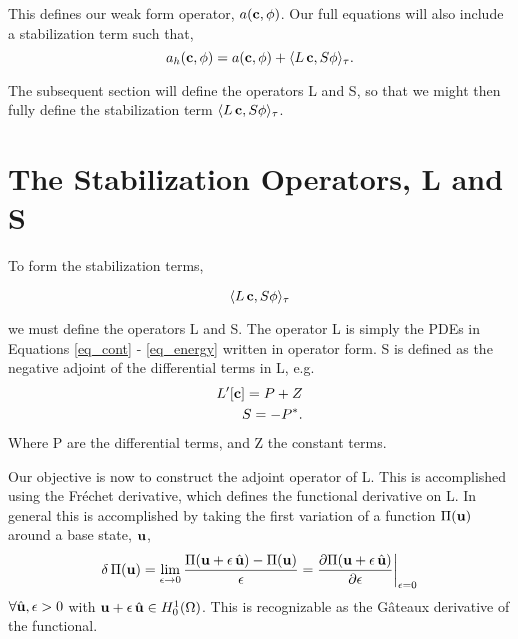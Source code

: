 This defines our weak form operator, $ a({\bf c},{\bf \phi})$. Our full equations will
also include a stabilization term such that,  
\begin{equation}
 a_h({\bf c},{\bf \phi}) = a({\bf c},{\bf \phi}) +  \langle L\,{\bf c},S{\bf \phi} \rangle_\tau. 
\end{equation}

The subsequent section will define the operators L and S, so that we
might then fully define the stabilization term $\langle L\,{\bf c},S{\bf \phi}
\rangle_\tau$. 

%
%
\section{The Stabilization Operators, L and S}


To form the stabilization terms, 

\begin{equation}
 \langle L\,{\bf c},S{\bf \phi} \rangle_\tau
\end{equation}

we must define the operators L and S. The operator L is simply the PDEs
in Equations \ref{eq_cont} - \ref{eq_energy} written in operator form. S is
defined as the negative adjoint of the differential terms in L, e.g.
\begin{align}
 L'[{\bf c}] = P + Z \\
 S = -P^*. 
\end{align}
Where P are the differential terms, and Z the constant terms. 

Our objective is now to construct the adjoint operator of L. This is
accomplished using the Fr\'echet derivative, which defines the
functional derivative on L. In general this is accomplished by taking
the first variation of a function $\Pi({\bf u})$ around a base state, ${\bf u}$,
\begin{equation}
 \delta\, \Pi({\bf u}) = \lim_{\epsilon \to 0} \frac{\Pi({\bf
  u}+\epsilon \, \hat {\bf u}) -
  \Pi({\bf u})}{\epsilon} =
  \frac{\partial \Pi({\bf u} +\epsilon \, \hat {\bf u})}{\partial \epsilon}
  \bigg|_{\epsilon = 0}
\end{equation}
$\forall \hat {\bf u}, \epsilon > 0$ with ${\bf u} + \epsilon \, \hat {\bf u} \in
H^1_0(\Omega)$. This is recognizable as the G\^{a}teaux
derivative of the functional. 


